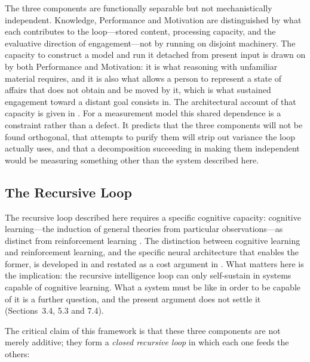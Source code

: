 \documentclass[12pt,a4paper]{article}
\begin{document}
\begin{enumerate}
The three components are functionally separable but not mechanistically independent. Knowledge, Performance and Motivation are distinguished by what each contributes to the loop---\hspace{0pt}stored content, processing capacity, and the evaluative direction of engagement---\hspace{0pt}not by running on disjoint machinery. The capacity to construct a model and run it detached from present input is drawn on by both Performance and Motivation: it is what reasoning with unfamiliar material requires, and it is also what allows a person to represent a state of affairs that does not obtain and be moved by it, which is what sustained engagement toward a distant goal consists in. The architectural account of that capacity is given in \citet{Gruber2026}. For a measurement model this shared dependence is a constraint rather than a defect. It predicts that the three components will not be found orthogonal, that attempts to purify them will strip out variance the loop actually uses, and that a decomposition succeeding in making them independent would be measuring something other than the system described here.
\end{enumerate}

\subsection{The Recursive Loop}

The recursive loop described here requires a specific cognitive capacity: cognitive learning---\hspace{0pt}the induction of general theories from particular observations---\hspace{0pt}as distinct from reinforcement learning \citep{Gruber2015}. The distinction between cognitive learning and reinforcement learning, and the specific neural architecture that enables the former, is developed in \citet{Gruber2015} and restated as a cost argument in \citet[\S4.2.4]{Gruber2026}. What matters here is the implication: the recursive intelligence loop can only self-sustain in systems capable of cognitive learning. What a system must be like in order to be capable of it is a further question, and the present argument does not settle it (Sections~3.4, 5.3 and 7.4).

The critical claim of this framework is that these three components are not merely additive; they form a \emph{closed recursive loop} in which each one feeds the others:
\end{document}
